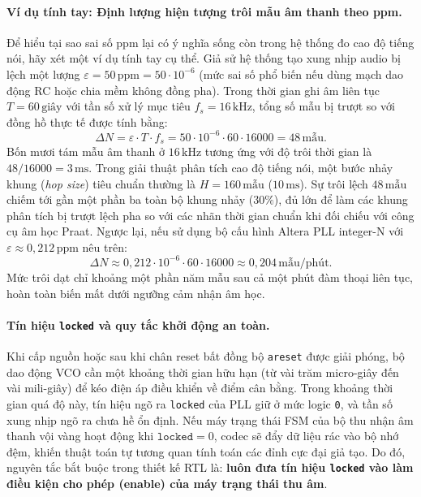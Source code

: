 \paragraph{Ví dụ tính tay: Định lượng hiện tượng trôi mẫu âm thanh theo ppm.}
Để hiểu tại sao sai số ppm lại có ý nghĩa sống còn trong hệ thống đo cao độ tiếng nói, hãy xét một ví dụ tính tay cụ thể. Giả sử hệ thống tạo xung nhịp audio bị lệch một lượng $\varepsilon = 50\,\text{ppm} = 50\cdot 10^{-6}$ (mức sai số phổ biến nếu dùng mạch dao động RC hoặc chia mềm không đồng pha). Trong thời gian ghi âm liên tục $T = 60\,\text{giây}$ với tần số xử lý mục tiêu $f_s = 16\,\text{kHz}$, tổng số mẫu bị trượt so với đồng hồ thực tế được tính bằng:
\begin{equation}
\Delta N = \varepsilon\cdot T\cdot f_s = 50\cdot 10^{-6}\cdot 60\cdot 16000 = 48\,\text{mẫu}.
\end{equation}
Bốn mươi tám mẫu âm thanh ở $16\,\text{kHz}$ tương ứng với độ trôi thời gian là $48 / 16000 = 3\,\text{ms}$. Trong giải thuật phân tích cao độ tiếng nói, một bước nhảy khung (\emph{hop size}) tiêu chuẩn thường là $H = 160\,\text{mẫu}$ ($10\,\text{ms}$). Sự trôi lệch $48\,\text{mẫu}$ chiếm tới gần một phần ba toàn bộ khung nhảy ($30\%$), đủ lớn để làm các khung phân tích bị trượt lệch pha so với các nhãn thời gian chuẩn khi đối chiếu với công cụ âm học Praat. Ngược lại, nếu sử dụng bộ cấu hình Altera PLL integer-N với $\varepsilon \approx 0{,}212\,\text{ppm}$ nêu trên:
\begin{equation}
\Delta N \approx 0{,}212\cdot 10^{-6}\cdot 60\cdot 16000 \approx 0{,}204\,\text{mẫu/phút}.
\end{equation}
Mức trôi dạt chỉ khoảng một phần năm mẫu sau cả một phút đàm thoại liên tục, hoàn toàn biến mất dưới ngưỡng cảm nhận âm học.

\paragraph{Tín hiệu \texttt{locked} và quy tắc khởi động an toàn.}
Khi cấp nguồn hoặc sau khi chân reset bất đồng bộ \texttt{areset} được giải phóng, bộ dao động VCO cần một khoảng thời gian hữu hạn (từ vài trăm micro-giây đến vài mili-giây) để kéo điện áp điều khiển về điểm cân bằng. Trong khoảng thời gian quá độ này, tín hiệu ngõ ra \texttt{locked} của PLL giữ ở mức logic \texttt{0}, và tần số xung nhịp ngõ ra chưa hề ổn định. Nếu máy trạng thái FSM của bộ thu nhận âm thanh vội vàng hoạt động khi $\texttt{locked} = 0$, codec sẽ đẩy dữ liệu rác vào bộ nhớ đệm, khiến thuật toán tự tương quan tính toán các đỉnh cực đại giả tạo. Do đó, nguyên tắc bắt buộc trong thiết kế RTL là: \textbf{luôn đưa tín hiệu \texttt{locked} vào làm điều kiện cho phép (enable) của máy trạng thái thu âm}.

